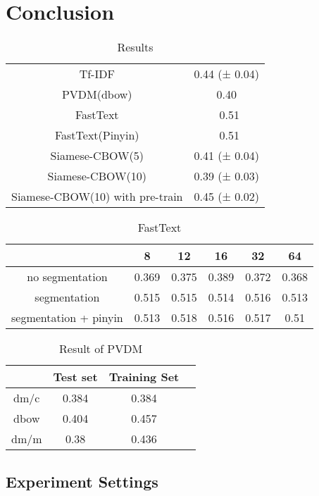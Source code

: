 \chapter{Conclusion}

\begin{table}[]
\centering
\caption{Results}
\label{resultAll}
\begin{tabular}{|c|c|}
\hline
Tf-IDF   & 0.44 (± 0.04) \\
PVDM(dbow) & 0.40    \\
FastText &  ~0.51   \\
FastText(Pinyin) &  ~0.51  \\
Siamese-CBOW(5) & 0.41 (± 0.04) \\
Siamese-CBOW(10) & 0.39 (± 0.03) \\
Siamese-CBOW(10) with pre-train & 0.45 (± 0.02) \\

\hline
\end{tabular}
\end{table}

\begin{table}[]
\centering
\caption{FastText}
\label{fasttext}
\begin{tabular}{|c|c|c|c|c|c|}
\hline
   & 8 & 12 & 16 & 32 & 64 \\
\hline
no segmentation  & 0.369 & 0.375 & 0.389 & 0.372 & 0.368 \\
segmentation  & 0.515 & 0.515 & 0.514 & 0.516 & 0.513 \\
segmentation + pinyin  & 0.513 & 0.518 & 0.516 & 0.517 & 0.51 \\
\hline
\end{tabular}
\end{table}

\begin{table}[]
\centering
\caption{Result of PVDM}
\label{resultAll}
\begin{tabular}{|c|c|c|c|}
\hline
      & Test set & Training Set \\
\hline
dm/c  & 0.384 &  0.384 \\
dbow &  0.404  & 0.457 \\
dm/m &  0.38  & 0.436 \\
\hline
\end{tabular}
\end{table}


\section{Experiment Settings}


